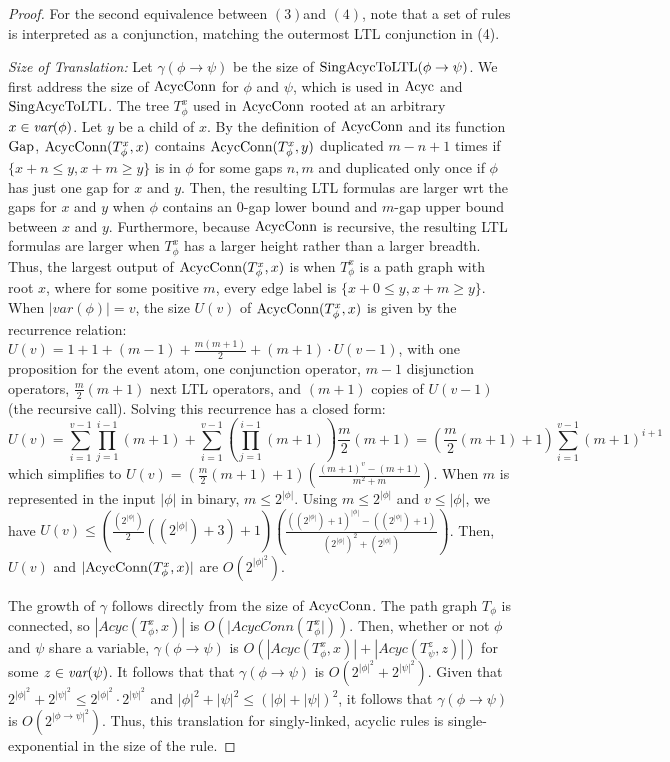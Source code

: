 \begin{proof}
For the second equivalence between $(3)$and $(4)$,
note that a set of rules is interpreted as a conjunction,
matching the outermost LTL conjunction in (4).
  
{\it Size of Translation:}
Let $\gamma(\phi\rightarrow\psi)$ be the size of $\text{SingAcycToLTL}(\phi\rightarrow\psi)$.
We first address the size of $\text{AcycConn}$ for $\phi$ and $\psi$,
which is used in $\text{Acyc}$ and $\text{SingAcycToLTL}$.
The tree $T_\phi^x$ used in $\text{AcycConn}$ rooted at an arbitrary $x\in\textit{var}(\phi)$.
Let $y$ be a child of $x$.
By the definition of $\text{AcycConn}$ and its function $\text{Gap}$,
$\text{AcycConn}(T_\phi^x, x)$
contains $\text{AcycConn}(T_\phi^x, y)$ duplicated $m-n+1$ times
if $\{x + n \leq y, x + m \geq y \}$ is in $\phi$
for some gaps $n,m$
and
duplicated only once if $\phi$ has just one gap for $x$ and $y$.
Then, the resulting LTL formulas are larger wrt the gaps for $x$ and $y$
when $\phi$ contains an $0$-gap lower bound and $m$-gap upper bound between $x$ and $y$.
Furthermore,
because $\text{AcycConn}$ is recursive,
the resulting LTL formulas are larger when $T_\phi^x$ has a larger height
rather than a larger breadth.
Thus,
the largest output of $\text{AcycConn}(T_\phi^x,x)$
is when $T_\phi^x$ is a path graph with root $x$,
where for some positive $m$,
every edge label is $\{ x + 0 \leq y, x + m \geq y \}$.
When $|var(\phi)|=v$,
the size $U(v)$ of $\text{AcycConn}(T_\phi^x,x)$ is given by the recurrence relation:
$U(v) = 1{+}1{+}(m{-}1){+}\frac{m(m+1)}{2}{+}(m{+}1) \cdot U(v-1)$,
with
one proposition for the event atom,
one conjunction operator,
$m-1$ disjunction operators,
$\frac{m}{2}(m+1)$ next LTL operators,
and $(m{+}1)$ copies of $U(v-1)$ (the recursive call).
Solving this recurrence has a closed form:
$$U(v) = \sum\limits_{i=1}^{v-1} \prod\limits_{j=1}^{i-1} (m{+}1)
    + \sum\limits_{i=1}^{v-1}(\prod\limits_{j=1}^{i-1} (m{+}1)) \frac{m}{2}(m+1)
    = (\frac{m}{2}(m+1) + 1) \sum\limits_{i=1}^{v-1} (m+1)^{i+1}$$
which simplifies to
$U(v) = (\frac{m}{2}(m+1)+1)
(\frac{(m+1)^{v}-(m+1)}{m^2+m})$.
When $m$ is represented in the input $|\phi|$ in binary, $m \leq 2^{|\phi|}$.
Using $m \leq 2^{|\phi|}$ and $v \leq |\phi|$,
we have $U(v) \leq (\frac{(2^{|\phi|})}{2}((2^{|\phi|})+3)+1)
(\frac{((2^{|\phi|})+1)^{|\phi|}-((2^{|\phi|})+1)}{(2^{|\phi|})^2+(2^{|\phi|})})$.
Then,
$U(v)$ and $|\text{AcycConn}(T_\phi^x,x)|$ are $O(2^{|\phi|^{2}})$.

The growth of $\gamma$ follows directly from the size of $\text{AcycConn}$.
The path graph $T_\phi$ is connected, so $|Acyc(T_\phi^x,x)|$ is $O(|AcycConn(T_\phi^x|))$.
Then, whether or not $\phi$ and $\psi$ share a variable,
$\gamma(\phi\rightarrow\psi)$ is $O(|Acyc(T_\phi^x,x)|+|Acyc(T_\psi^z,z)|)$
for some $z\in\textit{var}(\psi)$.
It follows that that $\gamma(\phi\rightarrow\psi)$ is $O(2^{|\phi|^{2}}+2^{|\psi|^{2}})$.
Given that $2^{|\phi|^{2}}+2^{|\psi|^{2}} \leq 2^{|\phi|^{2}} \cdot 2^{|\psi|^{2}}$
and $|\phi|^2 + |\psi|^2 \leq (|\phi|+|\psi|)^2$,
it follows that 
$\gamma(\phi\rightarrow\psi)$ is $O(2^{|\phi\rightarrow\psi|^{2}})$.
Thus,
this translation for singly-linked, acyclic rules is single-exponential in the size of the rule.
\end{proof}

